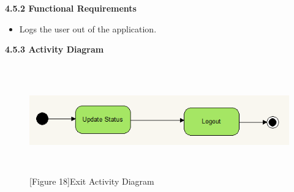\documentclass[29pt,a4paper]{moderncv}
\begin{document}
		\textbf{4.5.2 Functional Requirements}
			\begin{itemize}
				\item Logs the user out of the application.\\
			\end{itemize}
		
		\newpage
		\left\textbf{4.5.3 Activity Diagram}
				\begin{figure}
					\centering
					\\ \includegraphics[width=5.0in, height=1.5in]{./acLogout.png}
					\\\caption{[Figure 18]Exit Activity Diagram}
				\end{figure}
		
\end{document}
